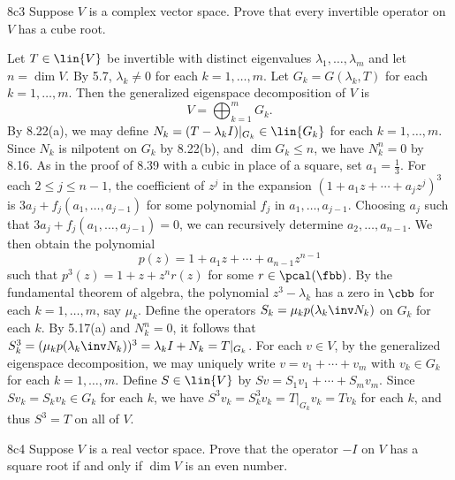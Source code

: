 \begin{exercise}{8c3}
    Suppose $V$ is a complex vector space.
    Prove that every invertible operator on $V$ has a cube root.

\end{exercise}

\begin{sol}
    Let $T \in \lin{V}$ be invertible with distinct eigenvalues $\lambda_1, \ldots, \lambda_m$ and let $n = \dim V$.
    By 5.7, $\lambda_k \neq 0$ for each $k = 1, \ldots, m$.
    Let $G_k = G(\lambda_k, T)$ for each $k = 1, \ldots, m$.
    Then the generalized eigenspace decomposition of $V$ is
    \[
        V = \bigoplus_{k=1}^m G_k.
    \]
    By 8.22(a), we may define $N_k = (T - \lambda_k I)|_{G_k} \in \lin{G_k}$ for each $k = 1, \ldots, m$.
    Since $N_k$ is nilpotent on $G_k$ by 8.22(b), and $\dim G_k \leq n$, we have $N_k^n = 0$ by 8.16.
    As in the proof of 8.39 with a cubic in place of a square, set $a_1 = \frac{1}{3}$.
    For each $2 \leq j \leq n-1$, the coefficient of $z^j$ in the expansion $(1 + a_1 z + \cdots + a_j z^j)^3$ is $3 a_j + f_j(a_1, \ldots, a_{j-1})$ for some polynomial $f_j$ in $a_1, \ldots, a_{j-1}$.
    Choosing $a_j$ such that $3 a_j + f_j(a_1, \ldots, a_{j-1}) = 0$, we can recursively determine $a_2, \ldots, a_{n-1}$.
    We then obtain the polynomial
    \[
        p(z) = 1 + a_1 z + \cdots + a_{n-1} z^{n-1}
    \]
    such that $p^3(z) = 1 + z + z^n r(z)$ for some $r \in \pcal(\fbb)$.
    By the fundamental theorem of algebra, the polynomial $z^3 - \lambda_k$ has a zero in $\cbb$ for each $k = 1, \ldots, m$, say $\mu_k$.
    Define the operators $S_k = \mu_k p(\lambda_k\inv N_k)$ on $G_k$ for each $k$.
    By 5.17(a) and $N_k^n = 0$, it follows that $S_k^3 = (\mu_k p(\lambda_k\inv N_k))^3 = \lambda_k I + N_k = T|_{G_k}$.
    For each $v \in V$, by the generalized eigenspace decomposition, we may uniquely write $v = v_1 + \cdots + v_m$ with $v_k \in G_k$ for each $k = 1, \ldots, m$.
    Define $S \in \lin{V}$ by $S v = S_1 v_1 + \cdots + S_m v_m$.
    Since $S v_k = S_k v_k \in G_k$ for each $k$, we have $S^3 v_k = S_k^3 v_k = T|_{G_k} v_k = T v_k$ for each $k$, and thus $S^3 = T$ on all of $V$.
\end{sol}

\begin{exercise}{8c4}
    Suppose $V$ is a real vector space.
    Prove that the operator $-I$ on $V$ has a square root if and only if $\dim V$ is an even number.
\end{exercise}

